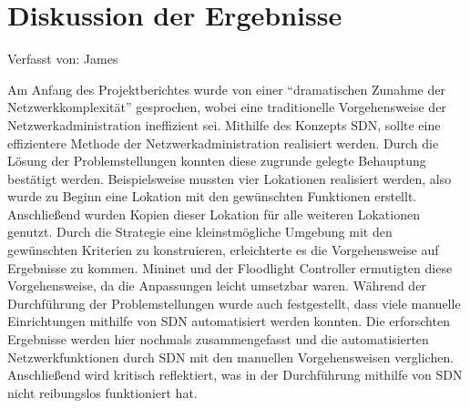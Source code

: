 \documentclass[fontsize=12pt,paper=a4,open=any,parskip=half,
  twoside=false,toc=listof,toc=bibliography,fleqn,leqno,
  captions=nooneline,captions=tableabove,british]{scrbook}
\begin{document}
{\chapter{Diskussion der Ergebnisse}
{\tiny Verfasst von: James\par}
Am Anfang des Projektberichtes wurde von einer “dramatischen Zunahme der Netzwerkkomplexität” gesprochen, wobei eine traditionelle Vorgehensweise der Netzwerkadministration ineffizient sei. Mithilfe des Konzepts SDN, sollte eine effizientere Methode der Netzwerkadministration realisiert werden. Durch die Lösung der Problemstellungen konnten diese zugrunde gelegte Behauptung bestätigt werden. Beispielsweise mussten vier Lokationen realisiert werden, also wurde zu Beginn eine Lokation mit den gewünschten Funktionen erstellt. Anschließend wurden Kopien dieser Lokation für alle weiteren Lokationen genutzt. Durch die Strategie eine kleinstmögliche Umgebung mit den gewünschten Kriterien zu konstruieren, erleichterte es die Vorgehensweise auf Ergebnisse zu kommen. Mininet und der Floodlight Controller ermutigten diese Vorgehensweise, da die Anpassungen leicht umsetzbar waren. Während der Durchführung der Problemstellungen wurde auch festgestellt, dass viele manuelle Einrichtungen mithilfe von SDN automatisiert werden konnten. Die erforschten Ergebnisse werden hier nochmals zusammengefasst und die automatisierten Netzwerkfunktionen durch SDN mit den manuellen Vorgehensweisen verglichen. Anschließend wird kritisch reflektiert, was in der Durchführung mithilfe von SDN nicht reibungslos funktioniert hat.  
}
\end{document}
